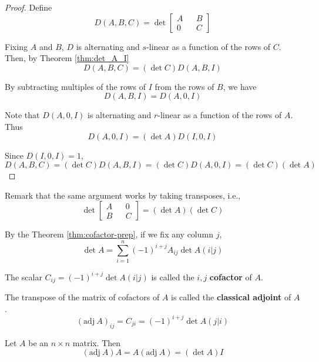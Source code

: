 \begin{proof}
	Define
	\[
		D(A,B,C) = \det \begin{bmatrix}
			A && B \\
			0 && C
		\end{bmatrix}
	\]
	
	Fixing $A$ and $B$, $D$ is alternating and $s$-linear as a function of the rows of $C$. Then, by Theorem \ref{thm:det_A_I}
	\[
		D(A, B, C) = (\det C)D(A,B,I)
	\]
	
	By subtracting multiples of the rows of $I$ from the rows of $B$, we have
	\[
		D(A, B, I) = D(A,0,I)
	\]
	
	Note that $D(A,0,I)$ is alternating and $r$-linear as a function of the rows of $A$. Thus
	\[
		D(A,0,I) = (\det A)D(I,0,I)
	\]
	
	Since $D(I,0,I) = 1$, 
	\[
		D(A,B,C) = (\det C)D(A,B,I) = (\det C)D(A,0,I) = (\det C)(\det A)
	\]
\end{proof}

Remark that the same argument works by taking transposes, i.e.,
	\[
		\det \begin{bmatrix}
			A && 0 \\
			B && C
		\end{bmatrix} = (\det A)(\det C)
	\]

By the Theorem \ref{thm:cofactor-prep}, if we fix any column $j$,
\[
	\det A = \sum_{i=1}^n (-1)^{i+j} A_{ij} \det A(i|j)
\]

\begin{definition}[Cofactor]
	The scalar $C_{ij} = (-1)^{i+j} \det A(i|j)$ is called the $i, j$ \textbf{cofactor} of $A$.
\end{definition}

\begin{definition}
	The transpose of the matrix of cofactors of $A$ is called the \textbf{classical adjoint} of $A$. 
	\[
		(\text{adj} ~A)_{ij} = C_{ji} = (-1)^{i+j} \det A(j|i)
	\]
\end{definition}

\begin{lemma}
	Let $A$ be an $n \times n$ matrix. Then
	\[
		(\text{adj} ~A)A = A(\text{adj} ~A) = (\det A)I
	\]
\end{lemma}

